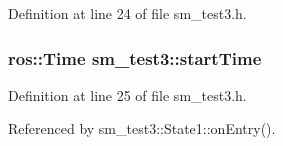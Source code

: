 Definition at line 24 of file sm\+\_\+test3.\+h.

\subsubsection[{\texorpdfstring{start\+Time}{startTime}}]{\setlength{\rightskip}{0pt plus 5cm}ros\+::\+Time sm\+\_\+test3\+::start\+Time}\hypertarget{namespacesm__test3_a3c530a2f1d2f50afbd4e56e96c1edd83}{}\label{namespacesm__test3_a3c530a2f1d2f50afbd4e56e96c1edd83}


Definition at line 25 of file sm\+\_\+test3.\+h.



Referenced by sm\+\_\+test3\+::\+State1\+::on\+Entry().

